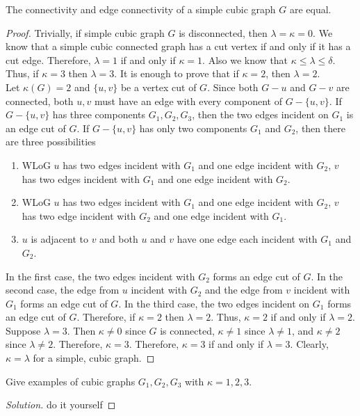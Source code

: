 \begin{theorem}
	The connectivity and edge connectivity of a simple cubic graph $G$ are equal.
\end{theorem}
\begin{proof}
	Trivially, if simple cubic graph $G$ is disconnected, then $\lambda = \kappa = 0$.
	We know that a simple cubic connected graph has a cut vertex if and only if it has a cut edge. Therefore, $\lambda = 1$ if and only if $\kappa = 1$.
	Also we know that $\kappa \le \lambda \le \delta$. Thus, if $\kappa = 3$ then $\lambda = 3$. It is enough to prove that if $\kappa = 2$, then $\lambda = 2$.\\

	Let $\kappa(G) = 2$ and $\{ u,v \}$ be a vertex cut of $G$. Since both $G-u$ and $G-v$ are connected, both $u,v$ must have an edge with every component of $G-\{ u,v \}$. If $G-\{ u, v \}$ has three components $G_1,G_2,G_3$, then the two edges incident on $G_1$ is an edge cut of $G$. If $G-\{ u,v\}$ has only two components $G_1$ and $G_2$, then there are three possibilities
	\begin{enumerate}
		\item WLoG $u$ has two edges incident with $G_1$ and one edge incident with $G_2$, $v$ has two edges incident with $G_1$ and one edge incident with $G_2$.
		\item WLoG $u$ has two edges incident with $G_1$ and one edge incident with $G_2$, $v$ has two edge incident with $G_2$ and one edge incident with $G_1$.
		\item $u$ is adjacent to $v$ and both $u$ and $v$ have one edge each incident with $G_1$ and $G_2$.
	\end{enumerate}
	In the first case, the two edges incident with $G_2$ forms an edge cut of $G$. In the second case, the edge from $u$ incident with $G_2$ and the edge from $v$ incident with $G_1$ forms an edge cut of $G$. In the third case, the two edges incident on $G_1$ forms an edge cut of $G$. Therefore, if $\kappa = 2$ then $\lambda = 2$. Thus, $\kappa = 2$ if and only if $\lambda = 2$.\\

	Suppose $\lambda = 3$. Then $\kappa \ne 0$ since $G$ is connected, $\kappa \ne 1$ since $\lambda \ne 1$, and $\kappa \ne 2$ since $\lambda \ne 2$. Therefore, $\kappa = 3$. Therefore, $\kappa = 3$ if and only if $\lambda = 3$. Clearly, $\kappa = \lambda$ for a simple, cubic graph.
\end{proof}

\begin{exercise}
	Give examples of cubic graphs $G_1,G_2,G_3$ with $\kappa = 1,2,3$.
\end{exercise}
\begin{proof}[Solution]
	do it yourself
\end{proof}

